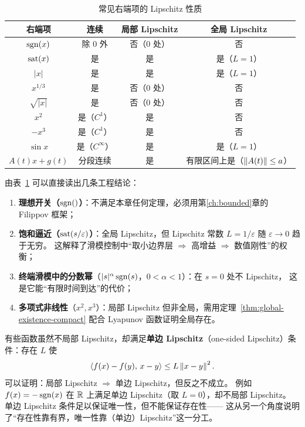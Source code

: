 \begin{table}[!htb]
  \centering
  \small
  \begin{tabular}{c|c|c|c}
    \hline
    右端项 & 连续 & 局部 Lipschitz & 全局 Lipschitz \\
    \hline
    $\operatorname{sgn}(x)$ & 除 $0$ 外 & 否（$0$ 处） & 否 \\
    $\operatorname{sat}(x)$ & 是 & 是 & 是（$L=1$）\\
    $|x|$ & 是 & 是 & 是（$L=1$）\\
    $x^{1/3}$ & 是 & 否（$0$ 处） & 否 \\
    $\sqrt{|x|}$ & 是 & 否（$0$ 处） & 否 \\
    $x^2$ & 是（$C^1$） & 是 & 否 \\
    $-x^3$ & 是（$C^1$） & 是 & 否 \\
    $\sin x$ & 是（$C^\infty$） & 是 & 是（$L=1$）\\
    $A(t)x+g(t)$ & 分段连续 & 是 & 有限区间上是（$\left\lVert A(t)\right\rVert\le a$）\\
    \hline
  \end{tabular}
  \caption{常见右端项的 Lipschitz 性质}
  \label{tab:lipschitz-table}
\end{table}

由表~\ref{tab:lipschitz-table} 可以直接读出几条工程结论：

\begin{enumerate}
  \item \textbf{理想开关（$\sgn$）}：不满足本章任何定理，必须用第\ref{ch:bounded}章的 Filippov 框架；
  \item \textbf{饱和逼近（$\operatorname{sat}(s/\varepsilon)$）}：全局 Lipschitz，但 Lipschitz 常数 $L=1/\varepsilon$ 随 $\varepsilon\to0$ 趋于无穷。
        这解释了滑模控制中“取小边界层 $\Rightarrow$ 高增益 $\Rightarrow$ 数值刚性”的权衡；
  \item \textbf{终端滑模中的分数幂}（$|s|^\alpha\operatorname{sgn}(s)$，$0<\alpha<1$）：在 $s=0$ 处不 Lipschitz，
        这是它能“有限时间到达”的代价；
  \item \textbf{多项式非线性}（$x^2,x^3$）：局部 Lipschitz 但非全局，需用定理~\ref{thm:global-existence-compact} 配合 Lyapunov 函数证明全局存在。
\end{enumerate}

\begin{remark}
  有些函数虽然不局部 Lipschitz，却满足\textbf{单边 Lipschitz}（one-sided Lipschitz）条件：存在 $L$ 使
  \begin{equation}
    \langle f(x)-f(y),\,x-y\rangle\le L\left\lVert x-y\right\rVert^2 .
  \end{equation}
  可以证明：局部 Lipschitz $\Rightarrow$ 单边 Lipschitz，但反之不成立。
  例如 $f(x)=-\operatorname{sgn}(x)$ 在 $\mathbb{R}$ 上满足单边 Lipschitz（取 $L=0$），却不局部 Lipschitz。
  单边 Lipschitz 条件足以保证唯一性，但不能保证存在性——
  这从另一个角度说明了“存在性靠有界，唯一性靠（单边）Lipschitz”这一分工。
\end{remark}

